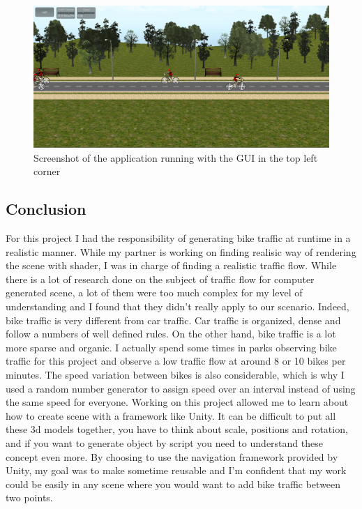 \documentclass{scrartcl}
\begin{document}
        \begin{figure} 
        \includegraphics[width=\textwidth]{AppWithGUI}
        \caption{Screenshot of the application running with the GUI in the top left
        corner} 
        \label{fig:app_gui} 
        \end{figure}
		
    \subsection{Conclusion} 
        For this project I had the responsibility of generating
        bike traffic at runtime in a realistic manner. While my partner is working on
        finding realisic way of rendering the scene with shader, I was in charge of
        finding a realistic traffic flow. While there is a lot of research done on the
        subject of traffic flow for computer generated scene, a lot of them were too
        much complex for my level of understanding and I found that they didn't really
        apply to our scenario. Indeed, bike traffic is very different from car traffic.
        Car traffic is organized, dense and follow a numbers of well defined rules. On
        the other hand, bike traffic is a lot more sparse and organic. I actually spend
        some times in parks observing bike traffic for this project and observe a low
        traffic flow at around 8 or 10 bikes per minutes. The speed variation between
        bikes is also considerable, which is why I used a random number generator to
        assign speed over an interval instead of using the same speed for everyone.
        Working on this project allowed me to learn about how to create scene with a
        framework like Unity. It can be difficult to put all these 3d models together,
        you have to think about scale, positions and rotation, and if you want to
        generate object by script you need to understand these concept even more. By
        choosing to use the navigation framework provided by Unity, my goal was to make
        sometime reusable and I'm confident that my work could be easily in any scene
        where you would want to add bike traffic between two points.
		
\end{document}

